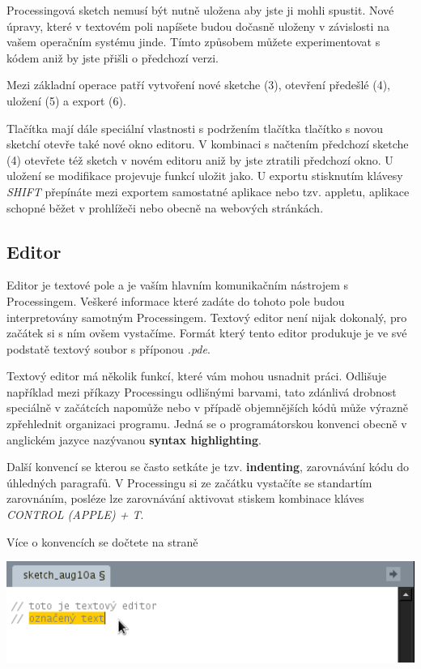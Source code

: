 \documentclass[11pt]{book}
\newcommand{\pododdil}[1]{\subsection{#1}\label{subsec:#1}}
\newcommand{\klavesy}[1]{\textsc{\em #1}}
\newcommand{\slovnik}[1]{\textbf{\gls{#1}}\index{#1}}
\begin{document}
Processingová sketch nemusí být nutně uložena aby jste ji mohli spustit. Nové úpravy, které v textovém poli napíšete budou dočasně uloženy v závislosti na vašem operačním systému jinde. Tímto způsobem můžete experimentovat s kódem aniž by jste přišli o předchozí verzi.

Mezi základní operace patří vytvoření nové sketche (3), otevření předešlé (4), uložení (5) a export (6).

Tlačítka mají dále speciální vlastnosti s podržením tlačítka tlačítko s novou sketchí otevře také nové okno editoru. V kombinaci s načtením předchozí sketche (4) otevřete též sketch v novém editoru aniž by jste ztratili předchozí okno. U uložení se modifikace projevuje funkcí uložit jako. U exportu stisknutím klávesy \klavesy{SHIFT} přepínáte mezi exportem samostatné aplikace nebo tzv. appletu, aplikace schopné běžet v prohlížeči nebo obecně na webových stránkách.

\pododdil{Editor}

Editor je textové pole a je vaším hlavním komunikačním nástrojem s Processingem. Veškeré informace které zadáte do tohoto pole budou interpretovány samotným Processingem. Textový editor není nijak dokonalý, pro začátek si s ním ovšem vystačíme. Formát který tento editor produkuje je ve své podstatě textový soubor s příponou {\em *.pde}.




Textový editor má několik funkcí, které vám mohou usnadnit práci. Odlišuje například mezi příkazy Processingu odlišnými barvami, tato zdánlivá drobnost speciálně v začátcích napomůže nebo v případě objemnějších kódů může výrazně zpřehlednit organizaci programu. Jedná se o programátorskou konvenci obecně v anglickém jazyce nazývanou \slovnik{syntax highlighting}.


Další konvencí se kterou se často setkáte je tzv. \slovnik{indenting}, zarovnávání kódu do úhledných paragrafů. V Processingu si ze začátku vystačíte se standartím zarovnáním, posléze lze zarovnávání aktivovat stiskem kombinace kláves \klavesy{CONTROL (APPLE) + T}.

Více o konvencích se dočtete na straně~\pageref{Předmluva}

\begin{center}
\includegraphics[width = 1\textwidth]{imgs/editor.png}
\end{center}
\end{document}
